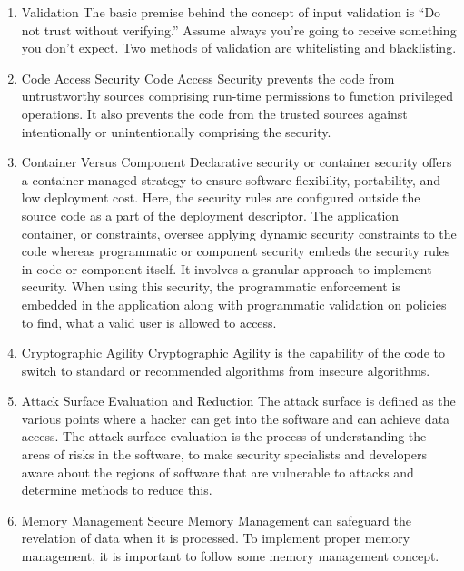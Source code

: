 \documentclass{article}
\begin{document}
    \begin{enumerate}
    	\item Validation \newline
    	The basic premise behind the concept of input validation is “Do not trust without verifying.” Assume always you’re going to receive something you don’t expect. Two methods of validation are whitelisting and blacklisting.
    	
    	\item Code Access Security \newline
    	Code Access Security prevents the code from untrustworthy sources comprising run-time permissions to function privileged operations. It also prevents the code from the trusted sources against intentionally or unintentionally comprising the security.
    	
    	\item Container Versus Component\newline
    	Declarative security or container security offers a container managed strategy to ensure software flexibility, portability, and low deployment cost. Here, the security rules are configured outside the source code as a part of the deployment descriptor. The application container, or constraints, oversee applying dynamic security constraints to the code whereas programmatic or component security embeds the security rules in code or component itself. It involves a granular approach to implement security. When using this security, the programmatic enforcement is embedded in the application along with programmatic validation on policies to find, what a valid user is allowed to access. 
    	
    	\item Cryptographic Agility \newline
    	Cryptographic Agility is the capability of the code to switch to standard or recommended algorithms from insecure algorithms.
    	
    	\item Attack Surface Evaluation and Reduction \newline
    	The attack surface is defined as the various points where a hacker can get into the software and can achieve data access. The attack surface evaluation is the process of understanding the areas of risks in the software, to make security specialists and developers aware about the regions of software that are vulnerable to attacks and determine methods to reduce this.
    	
    	\item Memory Management \newline
    	Secure Memory Management can safeguard the revelation of data when it is processed. To implement proper memory management, it is important to follow some memory management concept. 
    \end{enumerate}
\end{document}

